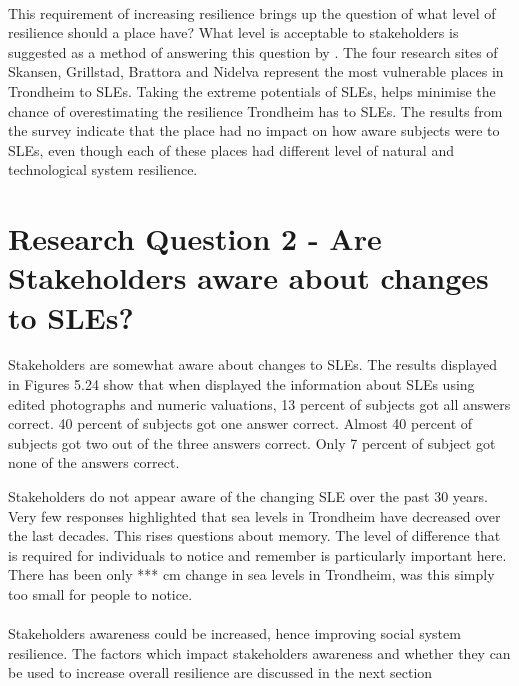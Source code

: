 \paragraph{}
This requirement of increasing resilience brings up the question of what level of resilience should a place have? What level is acceptable to stakeholders is suggested as a method of answering this question by \cite{gerkensmeier_governing_2018}. The four research sites of Skansen, Grillstad, Brattora and Nidelva represent the most vulnerable places in Trondheim to SLEs. Taking the extreme potentials of SLEs, helps minimise the chance of overestimating the resilience Trondheim has to SLEs. The results from the survey indicate that the place had no impact on how aware subjects were to SLEs, even though each of these places had different level of natural and technological system resilience. 




\section{Research Question 2 - Are Stakeholders aware about changes to SLEs?}
Stakeholders are somewhat aware about changes to SLEs. The results displayed in Figures 5.24
show that when displayed the information about SLEs using edited photographs and numeric valuations, 13 percent of subjects got all answers correct. 40 percent of subjects got one answer correct. Almost 40 percent of subjects got two out of the three answers correct. Only 7 percent of subject got none of the answers correct. 

 Stakeholders do not appear aware of the changing SLE over the past 30 years. Very few responses highlighted that sea levels in Trondheim have decreased over the last decades. This rises questions about memory. The level of difference that is required for individuals to notice and remember is particularly important here. There has been only *** cm change in sea levels in Trondheim, was this simply too small for people to notice. 

\paragraph{}

\paragraph{}
Stakeholders awareness could be increased, hence improving social system resilience. The factors which impact stakeholders awareness and whether they can be used to increase overall resilience are discussed in the next section 

